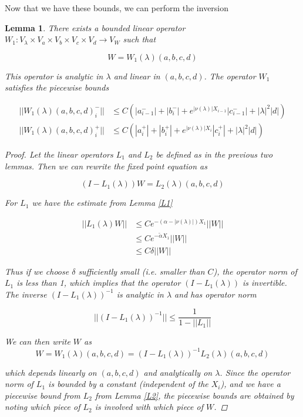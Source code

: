 \documentclass[12pt]{article}
\newtheorem{lemma}{Lemma}
\begin{document}
Now that we have these bounds, we can perform the inversion


\begin{lemma}\label{W1}
There exists a bounded linear operator $W_1: V_\lambda \times V_a \times V_b \times V_c \times V_d \rightarrow V_W$ such that 

\[
W = W_1(\lambda)(a,b,c,d)
\]

This operator is analytic in $\lambda$ and linear in $(a, b, c, d)$. The operator $W_1$ satisfies the piecewise bounds

\begin{align*}
||W_1(\lambda)(a,b,c,d)_i^-|| &\leq C ( |a_{i-1}^-| + |b_i^-| + e^{|\nu(\lambda)|X_{i-1}}|c_{i-1}^-| + |\lambda|^2 |d| ) \\
||W_1(\lambda)(a,b,c,d)_i^+|| &\leq C ( |a_i^+| + |b_i^+| + e^{|\nu(\lambda)|X_i}|c_i^+| + |\lambda|^2 |d| )
\end{align*}

\begin{proof}
Let the linear operators $L_1$ and $L_2$ be defined as in the previous two lemmas. Then we can rewrite the fixed point equation as

\[
(I - L_1(\lambda))W = L_2(\lambda)(a,b,c,d)
\]

For $L_1$ we have the estimate from Lemma \ref{L1}

\begin{align*}
||L_1(\lambda)W|| &\leq C e^{-(\alpha -|\nu(\lambda)|)X_1}||W|| \\
&\leq C e^{-\tilde{\alpha} X_1}||W|| \\
&\leq C \delta ||W||
\end{align*}

Thus if we choose $\delta$ sufficiently small (i.e. smaller than $C$), the operator norm of $L_1$ is less than 1, which implies that the operator $(I - L_1(\lambda))$ is invertible. The inverse $(I - L_1(\lambda))^{-1}$ is analytic in $\lambda$ and has operator norm 

\[
||(I - L_1(\lambda))^{-1}|| \leq \frac{1}{1 - ||L_1||}
\]

We can then write $W$ as
\[
W = W_1(\lambda)(a,b,c,d) = (I - L_1(\lambda))^{-1} L_2(\lambda)(a,b,c,d)
\]

which depends linearly on $(a,b,c,d)$ and analytically on $\lambda$. Since the operator norm of $L_1$ is bounded by a constant (independent of the $X_i$), and we have a piecewise bound from $L_2$ from Lemma \ref{L2}, the piecewise bounds are obtained by noting which piece of $L_2$ is involved with which piece of $W$.

\end{proof}
\end{lemma}
\end{document}
